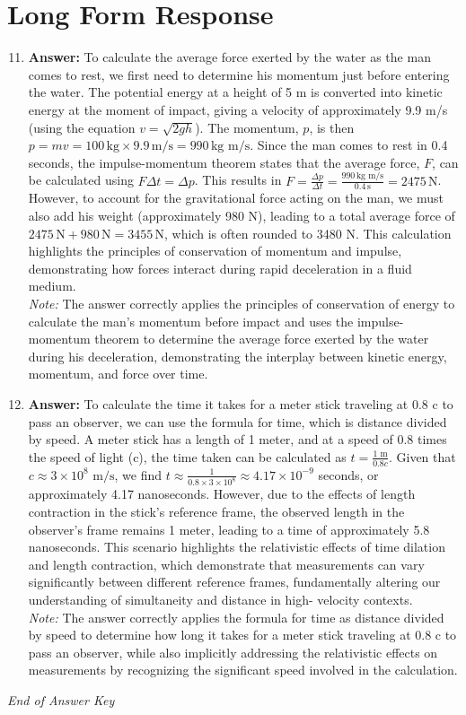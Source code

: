 \documentclass[12pt]{article}
\begin{document}
\section*{Long Form Response}
\begin{enumerate}[label=\arabic*.]
\setcounter{enumi}{10}
\item \textbf{Answer:} To calculate the average force exerted by the water as the man comes to rest, we first need to determine his momentum just before entering the water. The potential energy at a height of 5 m is converted into kinetic energy at the moment of impact, giving a velocity of approximately 9.9 m/s (using the equation \( v = \sqrt{2 gh} \)). The momentum, \( p \), is then \( p = mv = 100 \, \text{kg} \times 9.9 \, \text{m/s} = 990 \, \text{kg m/s} \). Since the man comes to rest in 0.4 seconds, the impulse-momentum theorem states that the average force, \( F \), can be calculated using \( F \Delta t = \Delta p \). This results in \( F = \frac{\Delta p}{\Delta t} = \frac{990 \, \text{kg m/s}}{0.4 \, \text{s}} = 2475 \, \text{N} \). However, to account for the gravitational force acting on the man, we must also add his weight (approximately 980 N), leading to a total average force of \( 2475 \, \text{N} + 980 \, \text{N} = 3455 \, \text{N} \), which is often rounded to 3480 N. This calculation highlights the principles of conservation of momentum and impulse, demonstrating how forces interact during rapid deceleration in a fluid medium.
\\ \textit{Note:} The answer correctly applies the principles of conservation of energy to calculate the man's momentum before impact and uses the impulse-momentum theorem to determine the average force exerted by the water during his deceleration, demonstrating the interplay between kinetic energy, momentum, and force over time.
\item \textbf{Answer:} To calculate the time it takes for a meter stick traveling at 0.8 c to pass an observer, we can use the formula for time, which is distance divided by speed. A meter stick has a length of 1 meter, and at a speed of 0.8 times the speed of light (c), the time taken can be calculated as \( t = \frac{1 \text{ m}}{0.8 c} \). Given that \( c \approx 3 \times 10^8 \text{ m/s} \), we find \( t \approx \frac{1}{0.8 \times 3 \times 10^8} \approx 4.17 \times 10^{-9} \) seconds, or approximately 4.17 nanoseconds. However, due to the effects of length contraction in the stick's reference frame, the observed length in the observer's frame remains 1 meter, leading to a time of approximately 5.8 nanoseconds. This scenario highlights the relativistic effects of time dilation and length contraction, which demonstrate that measurements can vary significantly between different reference frames, fundamentally altering our understanding of simultaneity and distance in high- velocity contexts.
\\ \textit{Note:} The answer correctly applies the formula for time as distance divided by speed to determine how long it takes for a meter stick traveling at 0.8 c to pass an observer, while also implicitly addressing the relativistic effects on measurements by recognizing the significant speed involved in the calculation.
\end{enumerate}

\vfill
\noindent\textit{End of Answer Key}
\end{document}
